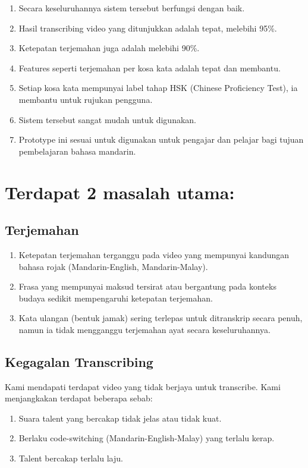 \documentclass[oneside]{utmthesis}
\begin{document}
\begin{enumerate}[label=\arabic*.]
    \item Secara keseluruhannya sistem tersebut berfungsi dengan baik.
    \item Hasil transcribing video yang ditunjukkan adalah tepat, melebihi 95\%.
    \item Ketepatan terjemahan juga adalah melebihi 90\%.
    \item Features seperti terjemahan per kosa kata adalah tepat dan membantu.
    \item Setiap kosa kata mempunyai label tahap HSK (Chinese Proficiency Test), ia membantu untuk rujukan pengguna.
    \item Sistem tersebut sangat mudah untuk digunakan.
    \item Prototype ini sesuai untuk digunakan untuk pengajar dan pelajar bagi tujuan pembelajaran bahasa mandarin.
\end{enumerate}

\section{Terdapat 2 masalah utama:}

\subsection{Terjemahan}
\begin{enumerate}[label=\arabic*.]
    \item Ketepatan terjemahan terganggu pada video yang mempunyai kandungan bahasa rojak (Mandarin-English, Mandarin-Malay).
    \item Frasa yang mempunyai maksud tersirat atau bergantung pada konteks budaya sedikit mempengaruhi ketepatan terjemahan.
    \item Kata ulangan (bentuk jamak) sering terlepas untuk ditranskrip secara penuh, namun ia tidak mengganggu terjemahan ayat secara keseluruhannya.
\end{enumerate}

\subsection{Kegagalan Transcribing}
Kami mendapati terdapat video yang tidak berjaya untuk transcribe. Kami menjangkakan terdapat beberapa sebab:
\begin{enumerate}[label=\arabic*.]
    \item Suara talent yang bercakap tidak jelas atau tidak kuat.
    \item Berlaku code-switching (Mandarin-English-Malay) yang terlalu kerap.
    \item Talent bercakap terlalu laju.
\end{enumerate}
\end{document}
